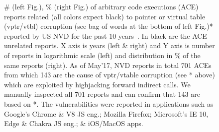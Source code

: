 \begin{figure}[t!]
\centering
{}
\vspace{-.5cm}
\caption{\# (left Fig.), \% (right Fig.) of arbitrary code executions (ACE) reports related (all colors expect black) to pointer or virtual table (vptr/vtbl) corruption 
(see bag of words at the bottom of left Fig.)* reported by US NVD for the past 10 years~\cite{NVD:ACE}. In black are the ACE unrelated reports.
X axis is years (left \& right) and Y axis is number of reports in logarithmic scale (left) and distribution in \% of the same reports (right).
As of May'17, NVD reports in total 701 ACEs from which 143 are the cause of vptr/vtable corruption (see * above) 
which are exploited by highjacking forward indirect calls. We manually inspected all 701 reports and can confirm that 143 are based on *.
The vulnerabilities were reported in applications such as Google's Chrome \& V8 JS eng.; Mozilla Firefox; Microsoft's IE 10, Edge \& Chakra JS eng.;
\& iOS/MacOS apps.}
\label{ace:nvd:statistics}
\vspace{-.7cm}
\end{figure}

